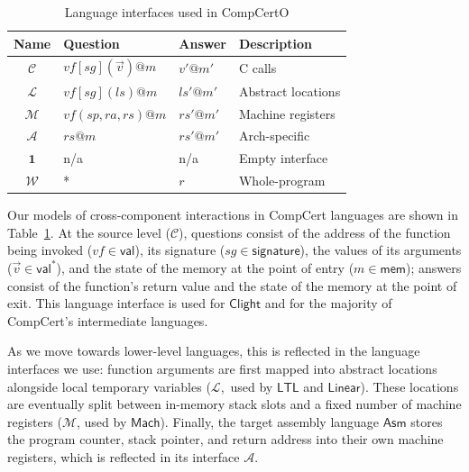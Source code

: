 \documentclass[11pt,oneside,draft]{book}
\theoremstyle{definition}
\newcommand{\kw}[1]{\ensuremath{ \mathsf{#1} }}
\newcommand{\figsize}{}
\begin{document}
\begin{table} %
  \figsize
  \centering
  \begin{tabular}{clll}
    \hline
    Name & Question & Answer & Description \\
    \hline
    $\mathcal{C}$ &
      $\mathit{vf}[\mathit{sg}](\vec{v})@m$ & $v'@m'$ &
      C calls \\
    $\mathcal{L}$ &
      $\mathit{vf}[\mathit{sg}](\mathit{ls})@m$ & $\mathit{ls}'@m'$ &
      Abstract locations \\
    $\mathcal{M}$ &
      $\mathit{vf}(\mathit{sp},\mathit{ra},\mathit{rs})@m$ & $\mathit{rs}'@m'$ &
      Machine registers \\
    $\mathcal{A}$ &
      $\mathit{rs}@m$ & $\mathit{rs}'@m'$ &
      Arch-specific \\
    $\mathbf{1}$ & n/a & n/a &
      Empty interface \\
    $\mathcal{W}$ & * & $r$ &
      Whole-program \\
    \hline
  \end{tabular}
  \caption{Language interfaces used in CompCertO}
  \label{tbl:li}
\end{table}

Our models of cross-component interactions in CompCert languages
are shown in Table~\ref{tbl:li}.
At the source level ($\mathcal{C}$),
questions consist of
the address of the function being invoked
($\mathit{vf} \in \kw{val}$),
its signature
($\mathit{sg} \in \kw{signature}$),
the values of its arguments
($\vec{v} \in \kw{val}^*$),
and the state of the memory at the point of entry
($m \in \kw{mem}$);
answers
consist of the function's return value
and the state of the memory at the point of exit.
This language interface is used for \kw{Clight} and
for the majority of CompCert's intermediate languages.

As we move towards lower-level languages,
this is reflected in the language interfaces we use:
function arguments are first mapped into
abstract locations alongside local temporary variables
($\mathcal{L}$,~used by \kw{LTL} and \kw{Linear}).
These locations are eventually split between
in-memory stack slots and a fixed number of machine registers
($\mathcal{M}$, used by \kw{Mach}).
Finally, the target assembly language \kw{Asm}
stores the program counter, stack pointer,
and return address into their own machine registers,
which is reflected in its interface $\mathcal{A}$.
\end{document}
